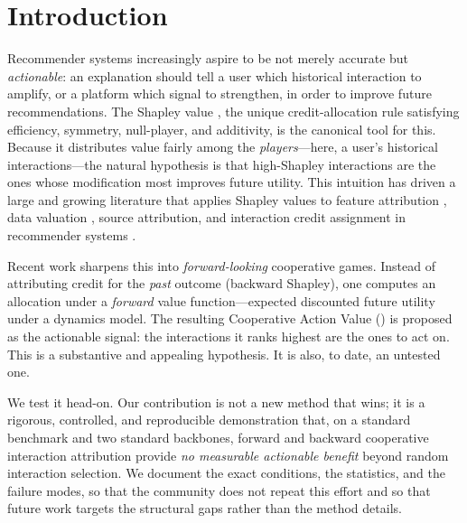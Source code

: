 \documentclass[pdflatex,sn-mathphys-num]{sn-jnl}%
\theoremstyle{thmstyleone}%
\theoremstyle{thmstyletwo}%
\theoremstyle{thmstylethree}%
\newcommand{\CAV}{\mathrm{CAV}}
\begin{document}

\maketitle

\section{Introduction}\label{sec1}

Recommender systems increasingly aspire to be not merely accurate but \emph{actionable}: an explanation should tell a user which historical interaction to amplify, or a platform which signal to strengthen, in order to improve future recommendations. The Shapley value \cite{shapley1953}, the unique credit-allocation rule satisfying efficiency, symmetry, null-player, and additivity, is the canonical tool for this. Because it distributes value fairly among the \emph{players}---here, a user's historical interactions---the natural hypothesis is that high-Shapley interactions are the ones whose modification most improves future utility. This intuition has driven a large and growing literature that applies Shapley values to feature attribution \cite{lundberg2017}, data valuation \cite{ghorbani2019datashapley}, source attribution, and interaction credit assignment in recommender systems \cite{louhichi2026dyhucog,nesmaoui2026drift}.

Recent work sharpens this into \emph{forward-looking} cooperative games. Instead of attributing credit for the \emph{past} outcome (backward Shapley), one computes an allocation under a \emph{forward} value function---expected discounted future utility under a dynamics model. The resulting Cooperative Action Value (\CAV{}) is proposed as the actionable signal: the interactions it ranks highest are the ones to act on. This is a substantive and appealing hypothesis. It is also, to date, an untested one.

We test it head-on. Our contribution is not a new method that wins; it is a rigorous, controlled, and reproducible demonstration that, on a standard benchmark and two standard backbones, forward and backward cooperative interaction attribution provide \emph{no measurable actionable benefit} beyond random interaction selection. We document the exact conditions, the statistics, and the failure modes, so that the community does not repeat this effort and so that future work targets the structural gaps rather than the method details.
\end{document}
